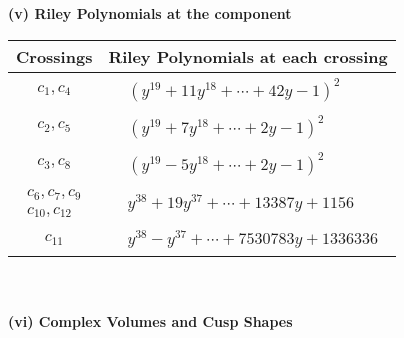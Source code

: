 \documentclass[1p]{elsarticle_modified}
\theoremstyle{definition}
\begin{document}
\newpage\renewcommand{\arraystretch}{1}
\flushleft \textbf{(v) Riley Polynomials at the component}\newline \\
\begin{tabular}{m{50pt}|m{274pt}}
Crossings & \hspace{64pt}Riley Polynomials at each crossing \\
\hline $$\begin{aligned}c_{1},c_{4}\end{aligned}$$&$\begin{aligned}
&(y^{19}+11 y^{18}+\cdots+42 y-1)^{2}
\end{aligned}$\\
\hline $$\begin{aligned}c_{2},c_{5}\end{aligned}$$&$\begin{aligned}
&(y^{19}+7 y^{18}+\cdots+2 y-1)^{2}
\end{aligned}$\\
\hline $$\begin{aligned}c_{3},c_{8}\end{aligned}$$&$\begin{aligned}
&(y^{19}-5 y^{18}+\cdots+2 y-1)^{2}
\end{aligned}$\\
\hline $$\begin{aligned}c_{6},c_{7},c_{9}\\c_{10},c_{12}\end{aligned}$$&$\begin{aligned}
&y^{38}+19 y^{37}+\cdots+13387 y+1156
\end{aligned}$\\
\hline $$\begin{aligned}c_{11}\end{aligned}$$&$\begin{aligned}
&y^{38}- y^{37}+\cdots+7530783 y+1336336
\end{aligned}$\\
\hline
\end{tabular}\\~\\
\newpage\flushleft \textbf{(vi) Complex Volumes and Cusp Shapes}
\end{document}
